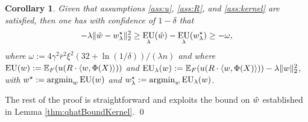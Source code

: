 \documentclass[]{interact}
\theoremstyle{plain}%
\newtheorem{corollary}[theorem]{Corollary}
\theoremstyle{definition}
\theoremstyle{remark}
\def\Expect{{\mathbb E}}
\def\argmin{\mathop{\rm argmin}}
\newcommand{\0}{\V{0}}
\newcommand{\1}{\V{1}}
\newcommand{\Halmos}{{\qed}}
\def\EU{\mathop{\rm EU}}
\theoremstyle{plain}
\theoremstyle{definition}
\begin{document}
\begin{corollary}\label{thm:shaiKernel}
  Given that assumptions \ref{ass:u}, \ref{ass:R}, and \ref{ass:kernel} are satisfied, then one has with confidence of
  $1-\delta$ that
  \[
    -\lambda\|\kqhat - \kq^\star_\lambda\|_2^2 \geq \EU_\lambda(\kqhat) - \EU_\lambda(\kq^\star_\lambda) \geq -\omega,
  \]
  where $\omega := 4\gamma^2\bar{r}^2 \xi^2(32+\ln(1/\delta))/(\lambda n)$ and where $\EU(\kq) := \Expect_F(u(R\cdot \langle \kq, \Phi(X)\rangle))$ and $\EU_\lambda(\kq) := \Expect_F(u(R\cdot \langle \kq, \Phi(X)\rangle)) - \lambda\|\kq\|_2^2$,
with $\kq^\star := \argmin_\kq \EU(\kq)$ and $\kq^\star_\lambda := \argmin_\kq \EU_\lambda(\kq)$.
\end{corollary}
The rest of the proof is straightforward and exploits the bound on ${\hat{w}}$ established in Lemma \ref{thm:qhatBoundKernel}. \Halmos
\end{document}
